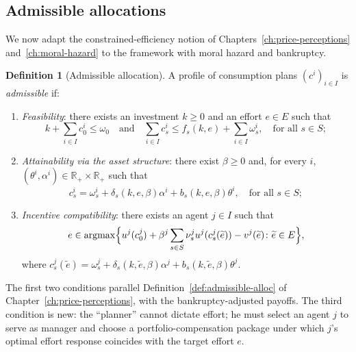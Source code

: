 \documentclass[11pt,a4paper,oneside]{book}
\def\R{\mathbb{R}}
\def\leq{\leqslant}
\def\geq{\geqslant}
\def\et{\quad \text{and} \quad}
\DeclareMathOperator*{\argmax}{argmax}
\theoremstyle{plain}
\theoremstyle{definition}
\newtheorem{definition}[theorem]{Definition}
\theoremstyle{remark}
\numberwithin{equation}{chapter}
\begin{document}
\subsection{Admissible allocations}

We now adapt the constrained-efficiency notion of Chapters~\ref{ch:price-perceptions} and~\ref{ch:moral-hazard} to the framework with moral hazard and bankruptcy.

\begin{definition}[Admissible allocation]\label{def:admissible-MH-CPP}
A profile of consumption plans $(c^i)_{i \in I}$ is \emph{admissible} if:
\begin{enumerate}
  \item[(i)] \emph{Feasibility}: there exists an investment $k \geq 0$ and an effort $e \in E$ such that
  \begin{equation*}
    k + \sum_{i \in I} c^i_0 \leq \omega_0
    \et
    \sum_{i \in I} c^i_s \leq f_s(k, e) + \sum_{i \in I} \omega^i_s, \quad \text{for all $s\in S$};
  \end{equation*}
  \item[(ii)] \emph{Attainability via the asset structure}: there exist $\beta \geq 0$ and, for every $i$, $(\theta^i, \alpha^i) \in \R_+ \times \R_+$ such that
  \begin{equation*}
    c^i_s = \omega^i_s + \delta_s(k, e, \beta) \alpha^i + b_s(k, e, \beta) \theta^i, \quad \text{for all $s\in S$};
  \end{equation*}
  \item[(iii)] \emph{Incentive compatibility}: there exists an agent $j \in I$ such that
  \begin{equation*}
    e \in \argmax \Bigl\{ u^j(c^j_0) + \beta^j \sum_{s \in S} \nu^j_s u^j(c^j_s(\widetilde{e})) - v^j(\widetilde{e}) \colon \widetilde{e} \in E \Bigr\},
  \end{equation*}
  where $c^j_s(\widetilde{e}) = \omega^j_s + \delta_s(k, \widetilde{e}, \beta) \alpha^j + b_s(k, \widetilde{e}, \beta) \theta^j$.
\end{enumerate}
\end{definition}

The first two conditions parallel Definition~\ref{def:admissible-alloc} of Chapter~\ref{ch:price-perceptions}, with the bankruptcy-adjusted payoffs.
The third condition is new: the ``planner'' cannot dictate effort; he must select an agent $j$ to serve as manager and choose a portfolio-compensation package under which $j$'s optimal effort response coincides with the target effort $e$.
\end{document}
